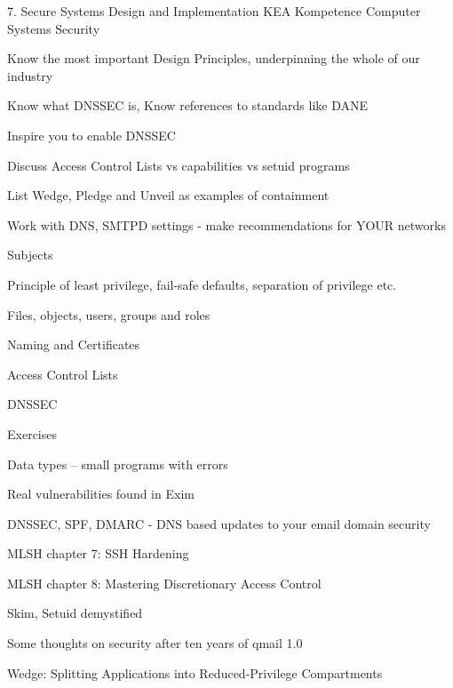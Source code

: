\documentclass[Screen16to9,17pt]{foils}
\begin{document}
\mytitlepage
{7. Secure Systems Design and Implementation}
{KEA Kompetence Computer Systems Security}





\begin{list2}
\item Know the most important Design Principles, underpinning the whole of our industry
\item Know what DNSSEC is, Know references to standards like DANE
\item Inspire you to enable DNSSEC
\item Discuss Access Control Lists vs capabilities vs setuid programs
\item List Wedge, Pledge and Unveil as examples of containment
\item Work with DNS, SMTPD settings - make recommendations for YOUR networks
\end{list2}



\begin{list1}
\item Subjects
\begin{list2}
\item Principle of least privilege, fail-safe defaults, separation of privilege etc.
\item Files, objects, users, groups and roles
\item Naming and Certificates
\item Access Control Lists
\item DNSSEC
\end{list2}
\item Exercises
\begin{list2}
\item Data types -- small programs with errors
\item Real vulnerabilities found in Exim
\item DNSSEC, SPF, DMARC - DNS based updates to your email domain security
\end{list2}
\end{list1}




\begin{list1}
\item MLSH chapter 7: SSH Hardening
\item MLSH chapter 8: Mastering Discretionary Access Control
\item Skim, Setuid demystified
\item Some thoughts on security after ten years of qmail 1.0
\item Wedge: Splitting Applications into Reduced-Privilege Compartments
\end{list1}
\end{document}
